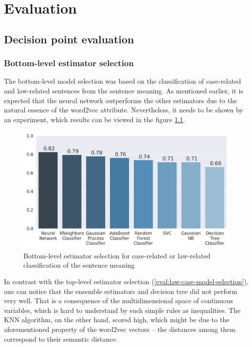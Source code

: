 \documentclass[
  digital, %
  notable,   %
  nolof,     %
  nolot,     %
]{fithesis3}
\begin{document}
\chapter{Evaluation}
\label{chp:evaluation}
\section{Decision point evaluation}

\subsection{Bottom-level estimator selection}
\label{eval:bottom-model-selection}
The bottom-level model selection was based on the classification of case-related and law-related sentences from the sentence meaning.
As mentioned earlier, it is expected that the neural network outperforms the other estimators due to the natural essence of the word2vec attribute.
Nevertheless, it needs to be shown by an experiment, which results can be viewed in the figure \ref{fig:bottom_level_model_selection}.
\begin{figure}[h]
\caption{Bottom-level estimator selection for case-related or law-related classification of the sentence meaning}
\label{fig:bottom_level_model_selection}
\includegraphics[width=\textwidth]{img/bottom_level_model_selection}
\end{figure}

In contrast with the top-level estimator selection (\ref{eval:law-case-model-selection}), one can notice that the ensemble estimators and decision tree did not perform very well.
That is a consequence of the multidimensional space of continuous variables, which is hard to understand by such simple rules as inequalities.
The KNN algorithm, on the other hand, scored high, which might be due to the aforementioned property of the word2vec vectors -- the distances among them correspond to their semantic distance.
\end{document}
